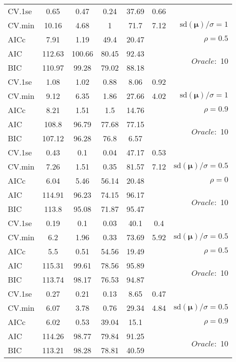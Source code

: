 \begin{table}
\begin{center}
\begin{tabular}{l*{5}{c}|r}
 \hline 
CV.1se & 0.65 & 0.47 & 0.24 & 37.69 & 0.66 & \\
CV.min & 10.16 & 4.68 & 1 & 71.7 & 7.12 &  $\mathrm{sd}(\mathbf{\mu})/\sigma=1$ \\
AICc & 7.91 & 1.19 & 49.4 & 20.47 & & $\rho=0.5$ \\
AIC & 112.63 & 100.66 & 80.45 & 92.43 & &  \multirow{2}{*}{$Oracle: $ 10} \\
BIC & 110.97 & 99.28 & 79.02 & 88.18 & &  \\
 \hline 
CV.1se & 1.08 & 1.02 & 0.88 & 8.06 & 0.92 & \\
CV.min & 9.12 & 6.35 & 1.86 & 27.66 & 4.02 &  $\mathrm{sd}(\mathbf{\mu})/\sigma=1$ \\
AICc & 8.21 & 1.51 & 1.5 & 14.76 & & $\rho=0.9$ \\
AIC & 108.8 & 96.79 & 77.68 & 77.15 & &  \multirow{2}{*}{$Oracle: $ 10} \\
BIC & 107.12 & 96.28 & 76.8 & 6.57 & &  \\
 \hline 
CV.1se & 0.43 & 0.1 & 0.04 & 47.17 & 0.53 & \\
CV.min & 7.26 & 1.51 & 0.35 & 81.57 & 7.12 &  $\mathrm{sd}(\mathbf{\mu})/\sigma=0.5$ \\
AICc & 6.04 & 5.46 & 56.14 & 20.48 & & $\rho=0$ \\
AIC & 114.91 & 96.23 & 74.15 & 96.17 & &  \multirow{2}{*}{$Oracle: $ 10} \\
BIC & 113.8 & 95.08 & 71.87 & 95.47 & &  \\
 \hline 
CV.1se & 0.19 & 0.1 & 0.03 & 40.1 & 0.4 & \\
CV.min & 6.2 & 1.96 & 0.33 & 73.69 & 5.92 &  $\mathrm{sd}(\mathbf{\mu})/\sigma=0.5$ \\
AICc & 5.5 & 0.51 & 54.56 & 19.49 & & $\rho=0.5$ \\
AIC & 115.31 & 99.61 & 78.56 & 95.89 & &  \multirow{2}{*}{$Oracle: $ 10} \\
BIC & 113.74 & 98.17 & 76.53 & 94.87 & &  \\
 \hline 
CV.1se & 0.27 & 0.21 & 0.13 & 8.65 & 0.47 & \\
CV.min & 6.07 & 3.78 & 0.76 & 29.34 & 4.84 &  $\mathrm{sd}(\mathbf{\mu})/\sigma=0.5$ \\
AICc & 6.02 & 0.53 & 39.04 & 15.1 & & $\rho=0.9$ \\
AIC & 114.26 & 98.77 & 79.84 & 91.25 & &  \multirow{2}{*}{$Oracle: $ 10} \\
BIC & 113.21 & 98.28 & 78.81 & 40.59 & &  \\
 \hline 
\end{tabular}
\end{center}
\vspace{-1cm}
\end{table}





